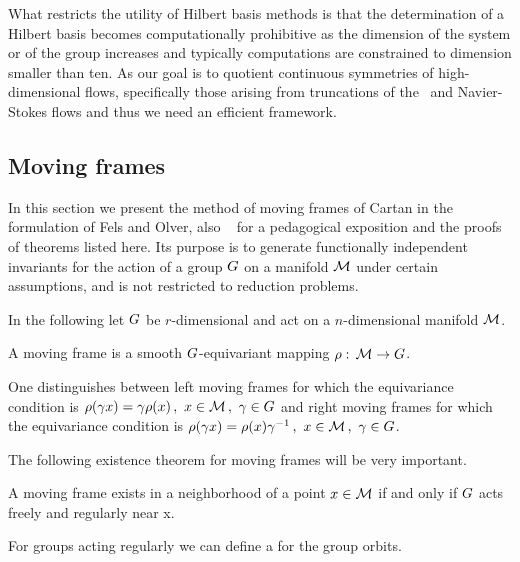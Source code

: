 What restricts the utility of Hilbert basis methods is that the
determination of a Hilbert basis becomes computationally
prohibitive as the dimension of the system or of the group
increases and typically
computations are constrained to dimension smaller than ten. As
our goal is to quotient continuous symmetries of
high-dimensional flows, specifically those arising from
truncations of the \KS\ and Navier-Stokes flows
and thus we need an efficient framework.




\subsection{Moving frames}
\label{sec:mf}

In this section we present the method of moving frames of
Cartan in the formulation of Fels and
Olver, also \cf~
for a pedagogical exposition and the proofs of theorems
listed here. Its purpose is to generate functionally
independent invariants for the action of a group $G$ on
a manifold $\mathcal{M}$ under certain assumptions, and is not
restricted to reduction problems.

In the following let $G$ be $r$-dimensional and act on a
$n$-dimensional manifold $\mathcal{M}$.
\begin{definition}
A moving frame is a smooth $G$-equivariant mapping
$\rho:\,\mathcal{M} \rightarrow G$.
\end{definition}
One distinguishes between left moving frames for which the
equivariance condition is $\rho(\gamma x)=\gamma\rho(x)\,,\
x\in\mathcal{M}\,,\ \gamma\in G$ and right moving frames for
which the equivariance condition is $\rho(\gamma
x)=\rho(x)\gamma^{-1}\,,\ x\in\mathcal{M}\,,\ \gamma\in G$.

The following existence theorem for moving frames will be
very important.

\begin{theorem}
 A moving frame exists in a neighborhood of a point $x\in
 \mathcal{M}$ if and only if $G$ acts freely and regularly
 near x.
\end{theorem}

For groups acting regularly we can define a {\csection} for
the group orbits.


